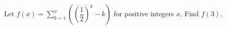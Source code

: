 Let $f(x)=\displaystyle\sum_{k=1}^{x}\left(\left(\dfrac{1}{2}\right)^k-k\right)$ for positive integers $x$. Find $f(3)$.
